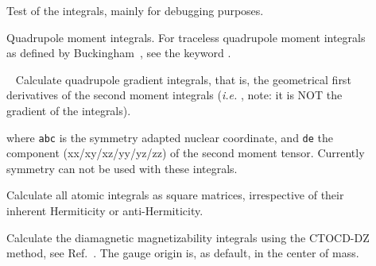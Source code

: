 \begin{description}
\item[] Test of the  integrals, mainly for
  debugging purposes.

\item[] Quadrupole moment integrals.
For traceless quadrupole moment integrals as
defined by Buckingham~\cite{adbacp12}, see the keyword .


\item[]\verb| |\newline
Calculate quadrupole gradient integrals, that is, the geometrical first
derivatives of the second moment integrals
({\it i.e.\/} , note: it is NOT the gradient of the  integrals).

where \verb|abc| is the symmetry adapted nuclear coordinate, and \verb|de| the
component (xx/xy/xz/yy/yz/zz) of the second moment tensor. Currently
symmetry can not be used with these integrals.

\item[] Calculate all atomic integrals as square
matrices, irrespective of their inherent Hermiticity or
anti-Hermiticity.

\item[] Calculate the diamagnetic magnetizability integrals using the CTOCD-DZ method,
 see Ref.~\cite{paololazz1,paololazz2}.
The gauge origin is, as default, in the center of mass. 



\end{description}
